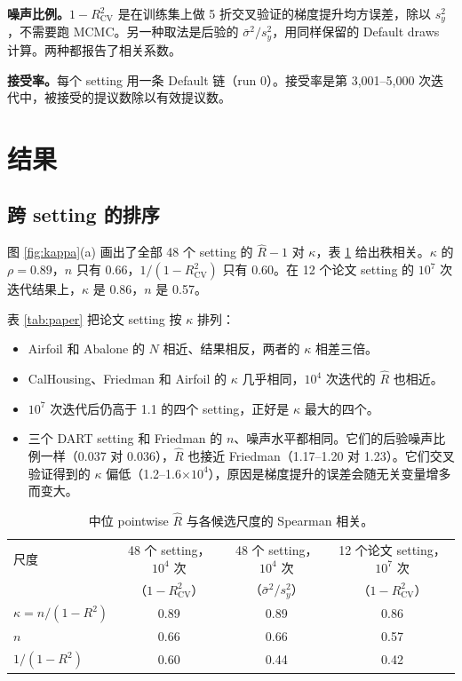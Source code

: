 \documentclass[11pt]{article}
\newcommand{\Rhat}{\hat R}
\begin{document}
\textbf{噪声比例。}$1-R^2_{\mathrm{CV}}$ 是在训练集上做 5 折交叉验证的梯度提升均方误差，除以 $s_y^2$，不需要跑 MCMC。另一种取法是后验的 $\bar\sigma^2/s_y^2$，用同样保留的 Default draws 计算。两种都报告了相关系数。

\textbf{接受率。}每个 setting 用一条 Default 链（run 0）。接受率是第 3,001--5,000 次迭代中，被接受的提议数除以有效提议数。

\section{结果}
\subsection{跨 setting 的排序}
图 \ref{fig:kappa}(a) 画出了全部 48 个 setting 的 $\Rhat-1$ 对 $\kappa$，表 \ref{tab:spearman} 给出秩相关。$\kappa$ 的 $\rho=0.89$，$n$ 只有 0.66，$1/(1-R^2_{\mathrm{CV}})$ 只有 0.60。在 12 个论文 setting 的 $10^7$ 次迭代结果上，$\kappa$ 是 0.86，$n$ 是 0.57。

表 \ref{tab:paper} 把论文 setting 按 $\kappa$ 排列：
\begin{itemize}
\item Airfoil 和 Abalone 的 $N$ 相近、结果相反，两者的 $\kappa$ 相差三倍。
\item CalHousing、Friedman 和 Airfoil 的 $\kappa$ 几乎相同，$10^4$ 次迭代的 $\Rhat$ 也相近。
\item $10^7$ 次迭代后仍高于 1.1 的四个 setting，正好是 $\kappa$ 最大的四个。
\item 三个 DART setting 和 Friedman 的 $n$、噪声水平都相同。它们的后验噪声比例一样（0.037 对 0.036），$\Rhat$ 也接近 Friedman（1.17--1.20 对 1.23）。它们交叉验证得到的 $\kappa$ 偏低（1.2--1.6$\times10^4$），原因是梯度提升的误差会随无关变量增多而变大。
\end{itemize}

\begin{table}[h]
\centering
\caption{中位 pointwise $\Rhat$ 与各候选尺度的 Spearman 相关。}
\label{tab:spearman}
\begin{tabular}{lccc}
\toprule
尺度 & 48 个 setting，$10^4$ 次 & 48 个 setting，$10^4$ 次 & 12 个论文 setting，$10^7$ 次 \\
 & （$1-R^2_{\mathrm{CV}}$） & （$\bar\sigma^2/s_y^2$） & （$1-R^2_{\mathrm{CV}}$） \\
\midrule
$\kappa=n/(1-R^2)$ & 0.89 & 0.89 & 0.86 \\
$n$ & 0.66 & 0.66 & 0.57 \\
$1/(1-R^2)$ & 0.60 & 0.44 & 0.42 \\
\bottomrule
\end{tabular}
\end{table}
\end{document}
